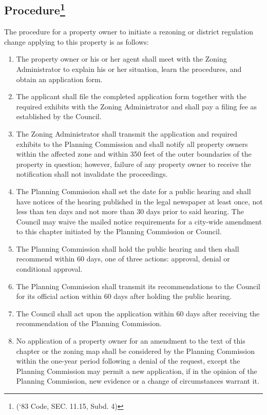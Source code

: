\subsection{Procedure\footnote{(‘83 Code, SEC. 11.15, Subd. 4)}}
The procedure for a property owner to initiate a rezoning or district regulation change applying to this property is as follows:
\begin{enumerate}[{\indent}1)]
    \item The property owner or his or her agent shall meet with the Zoning Administrator to explain his or her situation, learn the procedures, and obtain an application form.
    \item The applicant shall file the completed application form together with the required exhibits with the Zoning Administrator and shall pay a filing fee as established by the Council.
    \item The Zoning Administrator shall transmit the application and required exhibits to the Planning Commission and shall notify all property owners within the affected zone and within 350 feet of the outer boundaries of the property in question; however, failure of any property owner to receive the notification shall not invalidate the proceedings.
    \item The Planning Commission shall set the date for a public hearing and shall have notices of the hearing published in the legal newspaper at least once, not less than ten days and not more than 30 days prior to said hearing. The Council may waive the mailed notice requirements for a city-wide amendment to this chapter initiated by the Planning Commission or Council.
    \item The Planning Commission shall hold the public hearing and then shall recommend within 60 days, one of three actions: approval, denial or conditional approval.
    \item The Planning Commission shall transmit its recommendations to the Council for its official action within 60 days after holding the public hearing.
    \item The Council shall act upon the application within 60 days after receiving the recommendation of the Planning Commission.
    \item No application of a property owner for an amendment to the text of this chapter or the zoning map shall be considered by the Planning Commission within the one-year period following a denial of the request, except the Planning Commission may permit a new application, if in the opinion of the Planning Commission, new evidence or a change of circumstances warrant it.
\end{enumerate}

